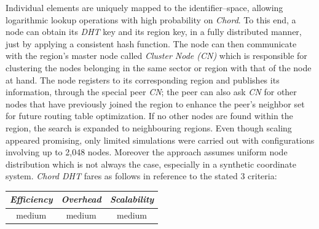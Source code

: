 Individual elements are uniquely mapped to the identifier--space,
allowing logarithmic lookup operations with high 
probability on \emph{Chord}. 
To this end, 
a node can obtain its \emph{DHT} key and its region key, 
in a fully distributed manner, just by applying a consistent hash function. 
The node can then communicate with the region's
master node called \emph{Cluster Node (CN)} which 
is responsible for clustering 
the nodes belonging in the same sector or 
region with that of the node at hand. 
The node registers to its corresponding region  and publishes
its information, through the special peer \emph{CN};
the peer can also ask \emph{CN} for other
nodes that have previously joined the region to enhance 
the peer's neighbor set for future routing table optimization.
%
If no other nodes are found within the region, 
the search is expanded to neighbouring regions.
%
%
%
Even though scaling appeared promising, only limited 
simulations were carried out with configurations involving up to 2,048 nodes.
Moreover the approach assumes uniform node distribution which
is not always the case, especially in a synthetic coordinate system.
\emph{Chord DHT} fares as follows in reference to the stated $3$ criteria:
\begin{center}
{\footnotesize
\begin{tabular}{ccc}
\emph{Efficiency} & \emph{Overhead} & \emph{Scalability} \\
\hline
%
medium &
%
medium &
%
medium
\end{tabular}
}
\end{center}



